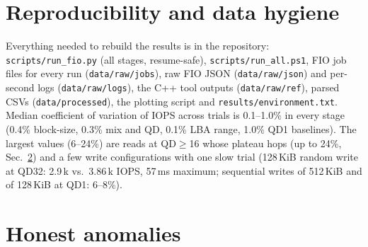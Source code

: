 ﻿\documentclass[10.5pt]{article}
\begin{document}
\section{Reproducibility and data hygiene}
Everything needed to rebuild the results is in the repository: \texttt{scripts/run\_fio.py} (all stages, resume-safe), \texttt{scripts/run\_all.ps1}, FIO job files for every run (\texttt{data/raw/jobs}), raw FIO JSON (\texttt{data/raw/json}) and per-second logs (\texttt{data/raw/logs}), the C++ tool outputs (\texttt{data/raw/ref}), parsed CSVs (\texttt{data/processed}), the plotting script and \texttt{results/environment.txt}. Median coefficient of variation of IOPS across trials is 0.1--1.0\% in every stage (0.4\% block-size, 0.3\% mix and QD, 0.1\% LBA range, 1.0\% QD1 baselines). The largest values (6--24\%) are reads at QD$\ge$16 whose plateau hops (up to 24\%, Sec.~\ref{sec:anomalies}) and a few write configurations with one slow trial (128\,KiB random write at QD32: 2.9\,k vs.\ 3.86\,k IOPS, 57\,ms maximum; sequential writes of 512\,KiB and of 128\,KiB at QD1: 6--8\%).

\section{Honest anomalies}\label{sec:anomalies}
\end{document}
